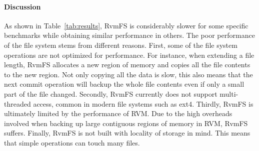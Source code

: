 \begin{table}[h]
\centering
\caption{Description of the macro-benchmark tests used to evaluate RvmFS.}
\label{tab:description}
\end{table}

\begin{table}[t!]
\centering
\caption{Macro benchmark results of RvmFS}
\label{tab:results}
\end{table}

\paragraph{Discussion}

As shown in Table~\ref{tab:results}, RvmFS is considerably slower for some
specific benchmarks while obtaining similar performance in others.  The poor
performance of the file system stems from different reasons.  First, some of
the file system operations are not optimized for performance. For instance,
when extending a file length, RvmFS allocates a new region of memory and copies
all the file contents to the new region. Not only copying all the data is slow,
this also means that the next commit operation will backup the whole file
contents even if only a small part of the file changed.  Secondly, RvmFS
currently does not support multi-threaded access, common in modern file systems
such as ext4.  Thirdly, RvmFS is ultimately limited by the performance of RVM.
Due to the high overheads involved when backing up large contiguous regions of
memory in RVM, RvmFS suffers.  Finally, RvmFS is not built with locality of
storage in mind. This means that simple operations can touch many files.

